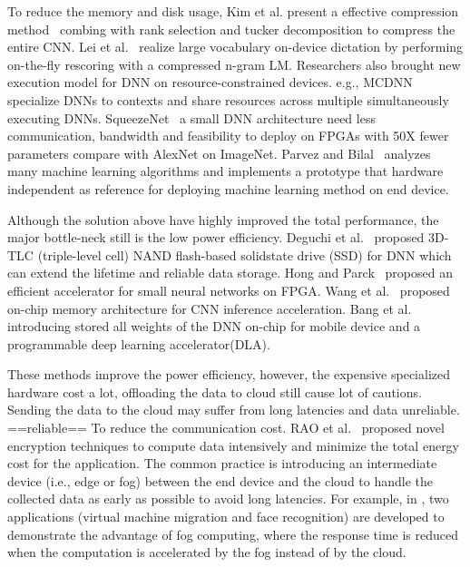 \documentclass[format=acmsmall, review=false, screen=true]{acmart}
\begin{document}
To reduce the memory and disk usage, Kim et al. present a effective compression method~\cite{kim2015compression} combing with rank selection and tucker decomposition to compress the entire CNN. Lei et al.~\cite{lei2013accurate} realize large vocabulary on-device dictation by performing on-the-fly rescoring with a compressed n-gram LM. Researchers also brought new execution model for DNN on resource-constrained devices. e.g., MCDNN~\cite{han2016mcdnn} specialize DNNs to contexts and share resources across multiple simultaneously executing DNNs. SqueezeNet~\cite{iandola2016squeezenet} a small DNN architecture need less communication, bandwidth and feasibility to deploy on FPGAs with 50X fewer parameters compare with AlexNet on ImageNet. Parvez and Bilal~\cite{parvez2017embedded} analyzes many machine learning algorithms and implements a prototype that hardware independent as reference for deploying machine learning method on end device.

Although the solution above have highly improved the total performance, the major bottle-neck still is the low power efficiency. Deguchi et al.~\cite{Deguchi2018} proposed 3D-TLC (triple-level cell) NAND flash-based solidstate drive (SSD) for DNN which can extend the lifetime and reliable data storage. Hong and Parck~\cite{Hong2017} proposed an efficient accelerator for small neural networks on FPGA. Wang et al.~\cite{Wang2016} proposed on-chip memory architecture for CNN inference acceleration. Bang et al.~\cite{Bang2017} introducing stored all weights of the DNN on-chip for mobile device and a programmable deep learning accelerator(DLA).

These methods improve the power efficiency, however, the expensive specialized hardware cost a lot, offloading the data to cloud still cause lot of cautions. Sending the data to the cloud may suffer from long latencies and data unreliable. ==reliable==
To reduce the communication cost. RAO et al.~\cite{raonovel} proposed novel encryption techniques to compute data intensively and minimize the total energy cost for the application.
The common practice is introducing an intermediate device (i.e., edge or fog) between the end device and the cloud to handle the collected data as early as possible to avoid long latencies. For example, in \cite{yi2015fog}, two applications (virtual machine migration and face recognition) are developed to demonstrate the advantage of fog computing, where the response time is reduced when the computation is accelerated by the fog instead of by the cloud.
\end{document}
